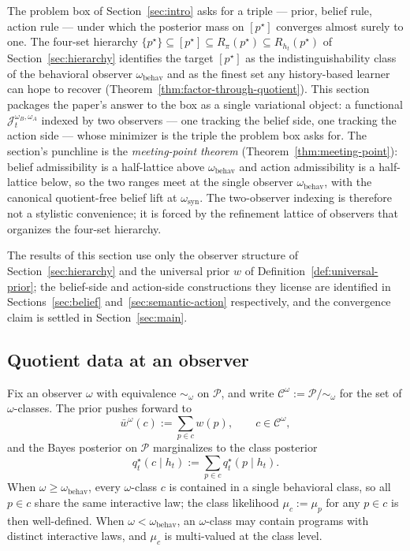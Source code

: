 \documentclass[11pt]{article}
\theoremstyle{definition}
\theoremstyle{remark}
\newcommand{\Ccal}{\mathcal{C}}
\newcommand{\Pcal}{\mathcal{P}}
\begin{document}
The problem box of Section~\ref{sec:intro} asks for a triple --- prior, belief rule, action rule --- under which the posterior mass on $[p^\star]$ converges almost surely to one. The four-set hierarchy $\{p^\star\}\subseteq[p^\star]\subseteq R_\pi(p^\star)\subseteq R_{h_t}(p^\star)$ of Section~\ref{sec:hierarchy} identifies the target $[p^\star]$ as the indistinguishability class of the behavioral observer $\omega_{\mathrm{behav}}$ and as the finest set any history-based learner can hope to recover (Theorem~\ref{thm:factor-through-quotient}). This section packages the paper's answer to the box as a single variational object: a functional $\mathcal J_t^{\omega_B,\omega_A}$ indexed by two observers --- one tracking the belief side, one tracking the action side --- whose minimizer is the triple the problem box asks for. The section's punchline is the \emph{meeting-point theorem} (Theorem~\ref{thm:meeting-point}): belief admissibility is a half-lattice above $\omega_{\mathrm{behav}}$ and action admissibility is a half-lattice below, so the two ranges meet at the single observer $\omega_{\mathrm{behav}}$, with the canonical quotient-free belief lift at $\omega_{\mathrm{syn}}$. The two-observer indexing is therefore not a stylistic convenience; it is forced by the refinement lattice of observers that organizes the four-set hierarchy.

The results of this section use only the observer structure of Section~\ref{sec:hierarchy} and the universal prior $w$ of Definition~\ref{def:universal-prior}; the belief-side and action-side constructions they license are identified in Sections~\ref{sec:belief} and~\ref{sec:semantic-action} respectively, and the convergence claim is settled in Section~\ref{sec:main}.

\subsection{Quotient data at an observer}
\label{sec:quotient-data}

Fix an observer $\omega$ with equivalence $\sim_\omega$ on $\Pcal$, and write $\Ccal^\omega:=\Pcal/\!\sim_\omega$ for the set of $\omega$-classes. The prior pushes forward to
\[
\bar w^\omega(c):=\sum_{p\in c}w(p),\qquad c\in\Ccal^\omega,
\]
and the Bayes posterior on $\Pcal$ marginalizes to the class posterior
\[
q_t^\star(c\mid h_t):=\sum_{p\in c}q_t^\star(p\mid h_t).
\]
When $\omega\ge\omega_{\mathrm{behav}}$, every $\omega$-class $c$ is contained in a single behavioral class, so all $p\in c$ share the same interactive law; the class likelihood $\mu_c:=\mu_p$ for any $p\in c$ is then well-defined. When $\omega<\omega_{\mathrm{behav}}$, an $\omega$-class may contain programs with distinct interactive laws, and $\mu_c$ is multi-valued at the class level.
\end{document}
